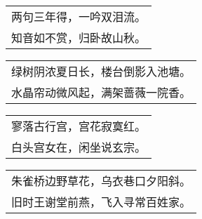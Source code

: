 \nopagebreak%
\nopagebreak%
\noindent\begin{minipage}{\linewidth}
  \vskip-3pt\begin{table}[H]
    \centering
    \begin{tabular}{@{}l@{}}
两句三年得，一吟双泪流。\\
知音如不赏，归卧故山秋。
    \end{tabular}
  \end{table}
\end{minipage}
\vspace{1cm}


\nopagebreak%
\nopagebreak%
\noindent\begin{minipage}{\linewidth}
  \vskip-3pt\begin{table}[H]
    \centering
    \begin{tabular}{@{}l@{}}
绿树阴浓夏日长，楼台倒影入池塘。\\
水晶帘动微风起，满架蔷薇一院香。
    \end{tabular}
  \end{table}
\end{minipage}
\vspace{1cm}


\nopagebreak%
\nopagebreak%
\noindent\begin{minipage}{\linewidth}
  \vskip-3pt\begin{table}[H]
    \centering
    \begin{tabular}{@{}l@{}}
寥落古行宫，宫花寂寞红。\\
白头宫女在，闲坐说玄宗。
    \end{tabular}
  \end{table}
\end{minipage}
\vspace{1cm}


\nopagebreak%
\nopagebreak%
\noindent\begin{minipage}{\linewidth}
  \vskip-3pt\begin{table}[H]
    \centering
    \begin{tabular}{@{}l@{}}
朱雀桥边野草花，乌衣巷口夕阳斜。\\
旧时王谢堂前燕，飞入寻常百姓家。
    \end{tabular}
  \end{table}
\end{minipage}
\vspace{1cm}



